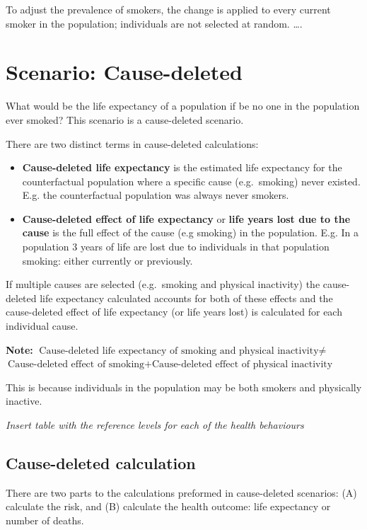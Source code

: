 \documentclass[]{book}
\begin{document}
To adjust the prevalence of smokers, the change is applied to every
current smoker in the population; individuals are not selected at
random. \ldots{}.

\section{Scenario: Cause-deleted}\label{scenario-cause-deleted}

What would be the life expectancy of a population if be no one in the
population ever smoked? This scenario is a cause-deleted scenario.

There are two distinct terms in cause-deleted calculations:

\begin{itemize}
\item
  \textbf{Cause-deleted life expectancy} is the estimated life
  expectancy for the counterfactual population where a specific cause
  (e.g.~smoking) never existed. E.g. the counterfactual population was
  always never smokers.
\item
  \textbf{Cause-deleted effect of life expectancy} or \textbf{life years
  lost due to the cause} is the full effect of the cause (e.g smoking)
  in the population. E.g. In a population 3 years of life are lost due
  to individuals in that population smoking: either currently or
  previously.
\end{itemize}

If multiple causes are selected (e.g.~smoking and physical inactivity)
the cause-deleted life expectancy calculated accounts for both of these
effects and the cause-deleted effect of life expectancy (or life years
lost) is calculated for each individual cause.

\textbf{Note:}
\(\text{Cause-deleted life expectancy of smoking and physical inactivity} \neq\)
\(\text{Cause-deleted effect of smoking} + \text{Cause-deleted effect of physical inactivity}\)

This is because individuals in the population may be both smokers and
physically inactive.

\emph{Insert table with the reference levels for each of the health
behaviours}

\subsection{Cause-deleted calculation}\label{cause-deleted-calculation}

There are two parts to the calculations preformed in cause-deleted
scenarios: (A) calculate the risk, and (B) calculate the health outcome:
life expectancy or number of deaths.
\end{document}
